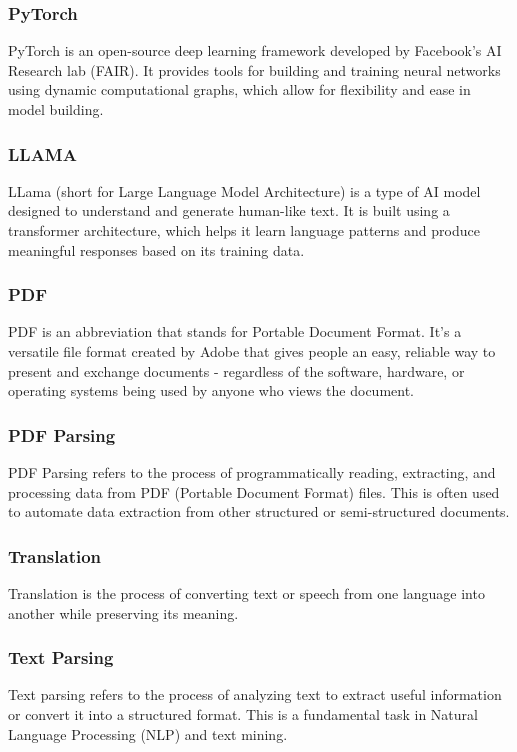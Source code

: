 \documentclass[12pt,oneside,openright,a4paper]{cpe-english-project}
\begin{document}
\subsubsection{PyTorch} PyTorch is an open-source deep learning framework developed by Facebook's AI Research lab (FAIR). It provides tools for building and training neural networks using dynamic computational graphs, which allow for flexibility and ease in model building.

\subsubsection{LLAMA} LLama (short for Large Language Model Architecture) is a type of AI model designed to understand and generate human-like text. It is built using a transformer architecture, which helps it learn language patterns and produce meaningful responses based on its training data.

\subsubsection{PDF} PDF is an abbreviation that stands for Portable Document Format. It's a versatile file format created by Adobe that gives people an easy, reliable way to present and exchange documents - regardless of the software, hardware, or operating systems being used by anyone who views the document.

\subsubsection{PDF Parsing} PDF Parsing refers to the process of programmatically reading, extracting, and processing data from PDF (Portable Document Format) files. This is often used to automate data extraction from other structured or semi-structured documents.

\subsubsection{Translation} Translation is the process of converting text or speech from one language into another while preserving its meaning.

\subsubsection{Text Parsing} Text parsing refers to the process of analyzing text to extract useful information or convert it into a structured format. This is a fundamental task in Natural Language Processing (NLP) and text mining.
\end{document}
